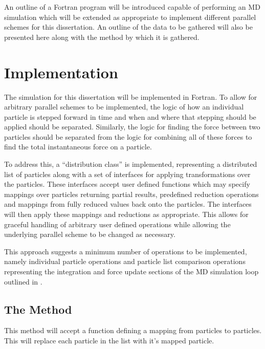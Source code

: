 An outline of a Fortran program will be introduced capable
of performing an MD simulation which will be extended as appropriate
to implement different parallel schemes for this dissertation.
%
An outline of the data to be gathered will also be presented here
along with the method by which it is gathered.

\section{Implementation}
\label{sec:methodology:subsec:implementation}

The simulation for this dissertation will be implemented in Fortran.
%
To allow for arbitrary parallel schemes to be implemented,
the logic of how an individual particle is stepped forward
in time and when and where that stepping should be applied
should be separated.
%
Similarly, the logic for finding the force between two particles
should be separated from the logic for combining all of these
\twobody{} forces to find the total instantaneous force on a particle.

To address this, a ``distribution class'' is implemented,
representing a distributed list of particles
along with a set of interfaces for
applying transformations over the particles.
%
These interfaces accept user defined functions which may specify
mappings over particles returning partial results,
predefined reduction operations and
mappings from fully reduced values back onto the particles.
%
The interfaces will then apply these mappings and reductions
as appropriate.
%
This allows for graceful handling of arbitrary user defined operations while
allowing the underlying parallel scheme to be changed as necessary.

%
This approach suggests a minimum number of operations to be implemented,
namely individual particle operations and particle list comparison
operations representing the integration and force update sections
of the MD simulation loop outlined in .


\subsection{The \individualoperation{} Method}
\label{sec:the_individual_operation_method}

This method will accept a function defining a mapping from
particles to particles.
This will replace each particle in the list with it's mapped
particle.

